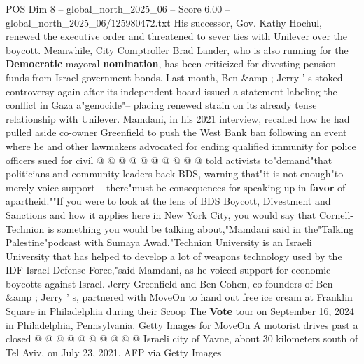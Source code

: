 \begin{textsample}{POS Dim 8 – global\_north\_2025\_06 – Score 6.00 – global\_north\_2025\_06/125980472.txt}
His successor, Gov.
Kathy Hochul, renewed the executive order and threatened to sever ties with Unilever over the boycott.
Meanwhile, City Comptroller Brad Lander, who is also running for the \textbf{Democratic} mayoral \textbf{nomination}, has been criticized for divesting pension funds from Israel government bonds.
Last month, Ben \&amp ; Jerry ' s stoked controversy again after its independent board issued a statement labeling the conflict in Gaza a"genocide"-- placing renewed strain on its already tense relationship with Unilever.
Mamdani, in his 2021 interview, recalled how he had pulled aside co-owner Greenfield to push the West Bank ban following an event where he and other lawmakers advocated for ending qualified immunity for police officers sued for civil @ @ @ @ @ @ @ @ @ @ told activists to"demand"that politicians and community leaders back BDS, warning that"it is not enough"to merely voice support -- there"must be consequences for speaking up in \textbf{favor} of apartheid.""If you were to look at the lens of BDS Boycott, Divestment and Sanctions and how it applies here in New York City, you would say that Cornell-Technion is something you would be talking about,"Mamdani said in the"Talking Palestine"podcast with Sumaya Awad."Technion University is an Israeli University that has helped to develop a lot of weapons technology used by the IDF Israel Defense Force,"said Mamdani, as he voiced support for economic boycotts against Israel.
Jerry Greenfield and Ben Cohen, co-founders of Ben \&amp ; Jerry ' s, partnered with MoveOn to hand out free ice cream at Franklin Square in Philadelphia during their Scoop The \textbf{Vote} tour on September 16, 2024 in Philadelphia, Pennsylvania.
Getty Images for MoveOn A motorist drives past a closed @ @ @ @ @ @ @ @ @ @ Israeli city of Yavne, about 30 kilometers south of Tel Aviv, on July 23, 2021.
AFP via Getty Images

\end{textsample}
